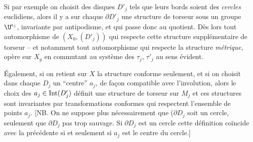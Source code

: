 Si par exemple on choisit des disques $D'_j$ tels que leurs
bords soient des {\it cercles} eu\-cli\-diens, alors il y a sur
chaque $\partial D'_j$ une structure de torseur sous un
groupe ${\U}^{\epsilon_j}$, invariante par antipodisme, et
qui passe donc au quotient.  Dès lors tout automorphisme
de $(X_0,(D'_j))$ qui respecte cette structure supplémentaire
de torseur -- et notamment tout automorphisme qui respecte
la structure {\it métrique}, opère sur $X_g$ en commutant au
système des $\tau_j$, $\tau'_j$ au sens évident.

Également, si on retient sur $X$ la structure conforme seulement,
et si on choisit dans chaque $D_j$ un ``centre'' $a_j$, de
fa\c con compatible avec l'involution, alors le choix des
$a_j\in {\rm Int}(D_j')$ définit une structure de torseur
sur $M_j$ et ces structures sont
invariantes par transformations conformes qui respectent
l'ensemble de points $a_j$. [NB. On ne suppose plus
nécessairement que ($\partial D_j$ soit un cercle, seulement 
que $\partial D_j$ pas trop sauvage.  Si $\partial D_j$
est un cercle cette définition coïncide avec la
précédente si et seulement si $a_j$ est le centre du cercle.]

